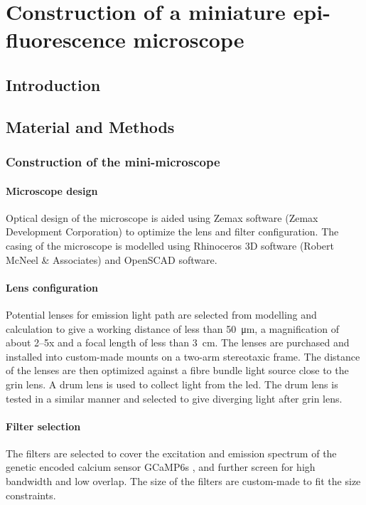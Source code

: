 \chapter{Construction of a miniature epi-fluorescence microscope}

\section{Introduction}

\section{Material and Methods}

\subsection{Construction of the mini-microscope}

\subsubsection{Microscope design}
Optical design of the microscope is aided using Zemax software (Zemax Development Corporation) to optimize the lens and filter configuration. The casing of the microscope is modelled using Rhinoceros 3D software (Robert McNeel \& Associates) and OpenSCAD software. 

\subsubsection{Lens configuration}
Potential lenses for emission light path are selected from modelling and calculation to give a working distance of less than \SI{50}{\um}, a magnification of about 2--5x and a focal length of less than \SI{3}{\cm}. The lenses are purchased and installed into custom-made mounts on a two-arm stereotaxic frame. The distance of the lenses are then optimized against a fibre bundle light source close to the \gls{grin} lens. A drum lens is used to collect light from the \gls{led}. The drum lens is tested in a similar manner and selected to give diverging light after \gls{grin} lens.

\subsubsection{Filter selection}
The filters are selected to cover the excitation and emission spectrum of the genetic encoded calcium sensor GCaMP6s \citep{chen13}, and further screen for high bandwidth and low overlap. The size of the filters are custom-made to fit the size constraints.

